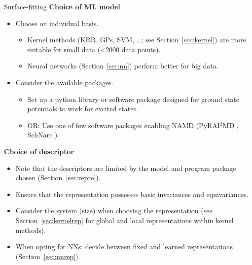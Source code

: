 \documentclass[9pt,bestpractices]{livecoms}
\begin{document}
\begin{Checklists*}[p!]
\begin{checklist}{Surface-fitting}
\textbf{Choice of ML model}
\begin{itemize}
\item Choose on individual basis.
\begin{itemize}
    \item Kernel methods (KRR, GPs, SVM, \dots; see Section~\ref{sec:kernel}) are more suitable for small data (<2000 data points).
    \item Neural networks (Section~\ref{sec:nn}) perform better for big data.
\end{itemize}
\item Consider the available packages.
\begin{itemize}
    \item Set up a python library or software package designed for ground state potentials to work for excited states.
    \item OR: Use one of few software packages enabling NAMD (PyRAI$^2$MD \cite{RN121}, SchNarc \cite{RN103,RN142}).
\end{itemize}
\end{itemize}

\textbf{Choice of descriptor}
\begin{itemize}
\item Note that the descriptors are limited by the model and program package chosen (Section~\ref{sec:repre}).
\item Ensure that the representation possesses basic invariances and equivariances.
\item Consider the system (size) when choosing the representation (see Section~\ref{sec:kernelrep} for global and local representations within kernel methods).
\item When opting for NNs: decide between fixed and learned representations (Section~\ref{sec:nnrep}).
\end{itemize}

\end{checklist}
\end{Checklists*}
\end{document}
